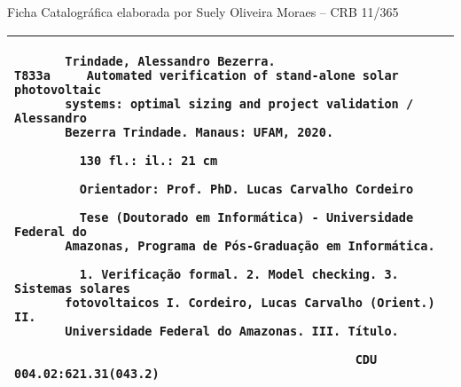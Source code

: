 \thispagestyle{plain}
%    
%    
%    
%
%
\thispagestyle{empty}
\null\vfill

\begin{center}
Ficha Catalográfica elaborada por Suely Oliveira Moraes – CRB 11/365
\begin{tabular}{|p{14.5cm}|}%
\hline
\begin{small}
\begin{verbatim}
       Trindade, Alessandro Bezerra.
T833a     Automated verification of stand-alone solar photovoltaic 
       systems: optimal sizing and project validation / Alessandro 
       Bezerra Trindade. Manaus: UFAM, 2020.

         130 fl.: il.: 21 cm 

         Orientador: Prof. PhD. Lucas Carvalho Cordeiro

         Tese (Doutorado em Informática) - Universidade Federal do
       Amazonas, Programa de Pós-Graduação em Informática. 

         1. Verificação formal. 2. Model checking. 3. Sistemas solares
       fotovoltaicos I. Cordeiro, Lucas Carvalho (Orient.) II. 
       Universidade Federal do Amazonas. III. Título.

                                               CDU 004.02:621.31(043.2)
\end{verbatim}
\end{small}
\\ \hline
\end{tabular}
\end{center}

\thispagestyle{plain}